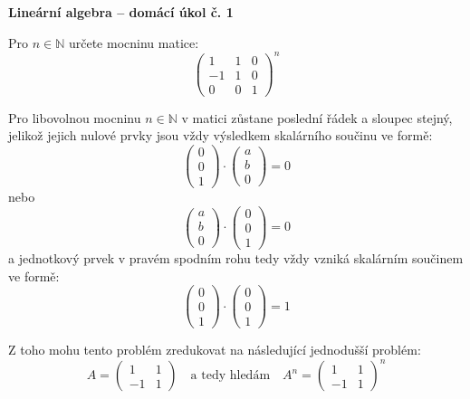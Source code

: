 \documentclass[11pt,a4paper]{article}
\begin{document}
\begin{center}
    \LARGE\textbf{Lineární algebra -- domácí úkol č. 1}
\end{center}
\vspace{1em}

Pro $n \in \mathbb{N}$ určete mocninu matice:
\[
  \begin{pmatrix}
    1 & 1 & 0 \\
    -1 & 1 & 0 \\
    0 & 0 & 1
  \end{pmatrix}^n
\]

Pro libovolnou mocninu $n \in \mathbb{N}$ v matici zůstane poslední řádek a sloupec stejný, jelikož jejich nulové prvky jsou vždy výsledkem skalárního součinu ve formě:
\[
  \begin{pmatrix} 0 \\ 0 \\ 1 \end{pmatrix} \cdot \begin{pmatrix} a \\ b \\ 0 \end{pmatrix} = 0
\]
nebo
\[
  \begin{pmatrix} a \\ b \\ 0 \end{pmatrix} \cdot \begin{pmatrix} 0 \\ 0 \\ 1 \end{pmatrix} = 0
\]
a jednotkový prvek v pravém spodním rohu tedy vždy vzniká skalárním součinem ve formě:
\[
  \begin{pmatrix} 0 \\ 0 \\ 1 \end{pmatrix} \cdot \begin{pmatrix} 0 \\ 0 \\ 1 \end{pmatrix} = 1
\]

Z toho mohu tento problém zredukovat na následující jednodušší problém:
\[
  A = \begin{pmatrix}
    1 & 1 \\
    -1 & 1
  \end{pmatrix} \quad\text{a tedy hledám}\quad A^n = \begin{pmatrix}
    1 & 1 \\
    -1 & 1
  \end{pmatrix}^n
\]
\end{document}
